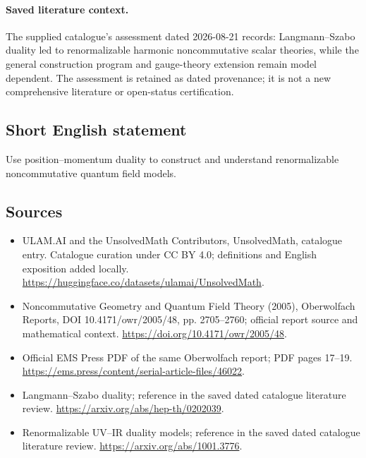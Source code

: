 \documentclass[11pt]{article}
\begin{document}
\paragraph{Saved literature context.} The supplied catalogue's assessment dated 2026-08-21 records: Langmann--Szabo duality led to renormalizable harmonic noncommutative scalar theories, while the general construction program and gauge-theory extension remain model dependent. The assessment is retained as dated provenance; it is not a new comprehensive literature or open-status certification.
\subsection{Short English statement}
Use position--momentum duality to construct and understand renormalizable noncommutative quantum field models.
\subsection{Sources}
\begin{itemize}
\item[\hypertarget{source:statement:1}{S1}] ULAM.AI and the UnsolvedMath Contributors, UnsolvedMath, catalogue entry. Catalogue curation under CC BY 4.0; definitions and English exposition added locally.
\url{https://huggingface.co/datasets/ulamai/UnsolvedMath}.
\item[\hypertarget{source:statement:2}{S2}] Noncommutative Geometry and Quantum Field Theory (2005), Oberwolfach Reports, DOI 10.4171/owr/2005/48, pp. 2705--2760; official report source and mathematical context.
\url{https://doi.org/10.4171/owr/2005/48}.
\item[\hypertarget{source:statement:3}{S3}] Official EMS Press PDF of the same Oberwolfach report; PDF pages 17--19.
\url{https://ems.press/content/serial-article-files/46022}.
\item[\hypertarget{source:statement:4}{S4}] Langmann--Szabo duality; reference in the saved dated catalogue literature review.
\url{https://arxiv.org/abs/hep-th/0202039}.
\item[\hypertarget{source:statement:5}{S5}] Renormalizable UV--IR duality models; reference in the saved dated catalogue literature review.
\url{https://arxiv.org/abs/1001.3776}.
\end{itemize}
\label{end:statement}
\end{document}
